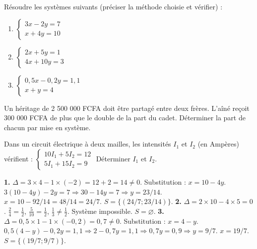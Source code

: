 \documentclass[11pt]{article}
\begin{document}
\begin{exercice}
Résoudre les systèmes suivants (préciser la méthode choisie et vérifier) :
\begin{enumerate}
    \item $\begin{cases} 3x - 2y = 7 \\ x + 4y = 10 \end{cases}$
    \item $\begin{cases} 2x + 5y = 1 \\ 4x + 10y = 3 \end{cases}$
    \item $\begin{cases} 0,5x - 0,2y = 1,1 \\ x + y = 4 \end{cases}$
\end{enumerate}
\end{exercice}

\begin{exercice}
Un héritage de 2 500 000 FCFA doit être partagé entre deux frères. L'aîné reçoit 300 000 FCFA de plus que le double de la part du cadet. Déterminer la part de chacun par mise en système.
\end{exercice}

\begin{exercice}
Dans un circuit électrique à deux mailles, les intensités $I_1$ et $I_2$ (en Ampères) vérifient :
$\begin{cases} 10 I_1 + 5 I_2 = 12 \\ 5 I_1 + 15 I_2 = 9 \end{cases}$
Déterminer $I_1$ et $I_2$.
\end{exercice}

\begin{corrige}[Exercice 1]
\textbf{1.} $\Delta = 3\times4 - 1\times(-2) = 12+2=14 \neq 0$. Substitution : $x=10-4y$. $3(10-4y)-2y=7 \Rightarrow 30-14y=7 \Rightarrow y=23/14$. $x=10-92/14=48/14=24/7$. $S=\{(24/7 ; 23/14)\}$.
\textbf{2.} $\Delta = 2\times10 - 4\times5 = 0$. $\frac{2}{4}=\frac{1}{2}$, $\frac{5}{10}=\frac{1}{2}$, $\frac{1}{3}\neq\frac{1}{2}$. Système impossible. $S=\varnothing$.
\textbf{3.} $\Delta = 0,5\times1 - 1\times(-0,2) = 0,7 \neq 0$. Substitution : $x=4-y$. $0,5(4-y)-0,2y=1,1 \Rightarrow 2-0,7y=1,1 \Rightarrow 0,7y=0,9 \Rightarrow y=9/7$. $x=19/7$. $S=\{(19/7 ; 9/7)\}$.
\end{corrige}
\end{document}
